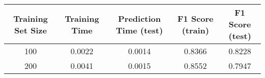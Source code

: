 \documentclass{ctexart}
\begin{document}
\begin{longtable}[]{@{}ccccc@{}}
\toprule
\begin{minipage}[b]{0.16\columnwidth}\centering\strut
Training Set Size\strut
\end{minipage} & \begin{minipage}[b]{0.21\columnwidth}\centering\strut
Training Time\strut
\end{minipage} & \begin{minipage}[b]{0.20\columnwidth}\centering\strut
Prediction Time (test)\strut
\end{minipage} & \begin{minipage}[b]{0.15\columnwidth}\centering\strut
F1 Score (train)\strut
\end{minipage} & \begin{minipage}[b]{0.14\columnwidth}\centering\strut
F1 Score (test)\strut
\end{minipage}\tabularnewline
\midrule
\endhead
\begin{minipage}[t]{0.16\columnwidth}\centering\strut
100\strut
\end{minipage} & \begin{minipage}[t]{0.21\columnwidth}\centering\strut
0.0022\strut
\end{minipage} & \begin{minipage}[t]{0.20\columnwidth}\centering\strut
0.0014\strut
\end{minipage} & \begin{minipage}[t]{0.15\columnwidth}\centering\strut
0.8366\strut
\end{minipage} & \begin{minipage}[t]{0.14\columnwidth}\centering\strut
0.8228\strut
\end{minipage}\tabularnewline
\begin{minipage}[t]{0.16\columnwidth}\centering\strut
200\strut
\end{minipage} & \begin{minipage}[t]{0.21\columnwidth}\centering\strut
0.0041\strut
\end{minipage} & \begin{minipage}[t]{0.20\columnwidth}\centering\strut
0.0015\strut
\end{minipage} & \begin{minipage}[t]{0.15\columnwidth}\centering\strut
0.8552\strut
\end{minipage} & \begin{minipage}[t]{0.14\columnwidth}\centering\strut
0.7947\strut
\end{minipage}\tabularnewline

\end{longtable}
\end{document}
